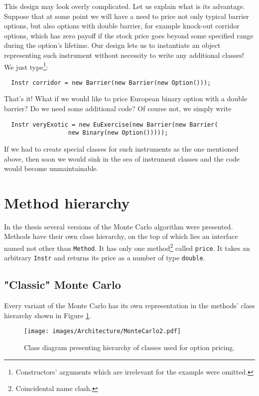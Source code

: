 \documentclass[a4paper,11pt, twoside]{book}
\theoremstyle{definition}
\theoremstyle{remark}
\newcounter{example}[chapter]
\begin{document}
This design may look overly complicated. Let us explain what is its advantage. Suppose that at some point we will have a need to price not only typical barrier options, but also options with double barrier, for example knock-out corridor options, which has zero payoff if the stock price goes beyond some specified range during the option's lifetime. Our design lets us to instantiate an object representing such instrument without necessity to write any additional classes! We just type\footnote{Constructors' arguments which are irrelevant for the example were omitted.}:
\begin{lstlisting}
  Instr corridor = new Barrier(new Barrier(new Option()));
\end{lstlisting}
That's it! What if we would like to price European binary option with a double barrier? Do we need some additional code? Of course not, we simply write
\begin{lstlisting}
  Instr veryExotic = new EuExercise(new Barrier(new Barrier(
				  new Binary(new Option()))));
\end{lstlisting}
If we had to create special classes for such instruments as the one mentioned above, then soon we would sink in the sea of instrument classes and the code would become unmaintainable.
	
\section{Method hierarchy}
In the thesis several versions of the Monte Carlo algorithm were presented. Methods have their own class hierarchy, on the top of which lies an interface named not other than \texttt{Method}. It has only one method\footnote{Coincidental name clash.} called \texttt{price}. It takes an arbitrary \texttt{Instr} and returns its price as a number of type \texttt{double}.

\subsection{"Classic" Monte Carlo}
Every variant of the Monte Carlo has its own representation in the methods' class hierarchy shown in Figure \ref{fig:arch:MonteCarlo}.
\begin{figure}
\centering
 \texttt{[image: images/Architecture/MonteCarlo2.pdf]}
\caption{Class diagram presenting hierarchy of classes used for option pricing.}
\label{fig:arch:MonteCarlo}
\end{figure}
\end{document}

